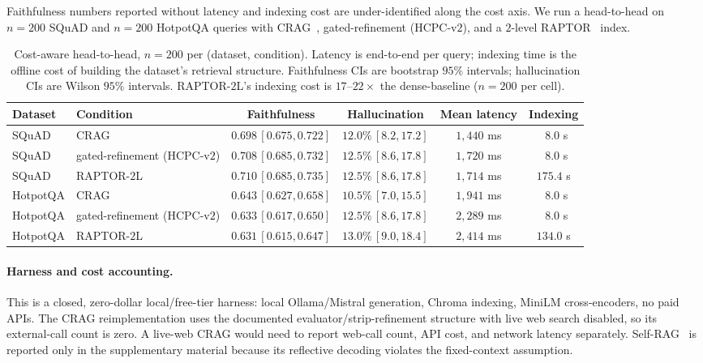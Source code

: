 Faithfulness numbers reported without latency and indexing cost are
under-identified along the cost axis. We run a head-to-head on
$n=200$ SQuAD and $n=200$ HotpotQA queries with CRAG~\citep{yan2024crag},
gated-refinement (HCPC-v$2$), and a $2$-level
RAPTOR~\citep{raptor2024} index.

\begin{table}[!htb]
\centering
\caption{Cost-aware head-to-head, $n=200$ per (dataset, condition).
Latency is end-to-end per query; indexing time is the offline cost
of building the dataset's retrieval structure. Faithfulness CIs are
bootstrap $95\%$ intervals; hallucination CIs are Wilson $95\%$
intervals. RAPTOR-$2$L's indexing cost is $17$--$22\times$ the
dense-baseline ($n=200$ per cell).}
\label{tab:cost_main}
\scriptsize
\begin{tabular}{llcccc}
\toprule
Dataset & Condition & Faithfulness & Hallucination & Mean latency & Indexing \\
\midrule
SQuAD    & CRAG                       & $0.698\,[0.675,0.722]$ & $12.0\%\,[8.2,17.2]$  & $1{,}440$ ms & $\phantom{1}8.0$ s \\
SQuAD    & gated-refinement (HCPC-v$2$) & $0.708\,[0.685,0.732]$ & $12.5\%\,[8.6,17.8]$  & $1{,}720$ ms & $\phantom{1}8.0$ s \\
SQuAD    & RAPTOR-$2$L                & $0.710\,[0.685,0.735]$ & $12.5\%\,[8.6,17.8]$  & $1{,}714$ ms & $175.4$ s \\
HotpotQA & CRAG                       & $0.643\,[0.627,0.658]$ & $10.5\%\,[7.0,15.5]$  & $1{,}941$ ms & $\phantom{1}8.0$ s \\
HotpotQA & gated-refinement (HCPC-v$2$) & $0.633\,[0.617,0.650]$ & $12.5\%\,[8.6,17.8]$  & $2{,}289$ ms & $\phantom{1}8.0$ s \\
HotpotQA & RAPTOR-$2$L                & $0.631\,[0.615,0.647]$ & $13.0\%\,[9.0,18.4]$  & $2{,}414$ ms & $134.0$ s \\
\bottomrule
\end{tabular}
\end{table}

\paragraph{Harness and cost accounting.} This is a closed,
zero-dollar local/free-tier harness: local Ollama/Mistral generation,
Chroma indexing, MiniLM cross-encoders, no paid APIs. The CRAG
reimplementation uses the documented evaluator/strip-refinement
structure with live web search disabled, so its external-call count
is zero. A live-web CRAG would need to report web-call count, API
cost, and network latency separately. Self-RAG~\citep{asai2024selfrag}
is reported only in the supplementary material because its reflective decoding
violates the fixed-context assumption.

